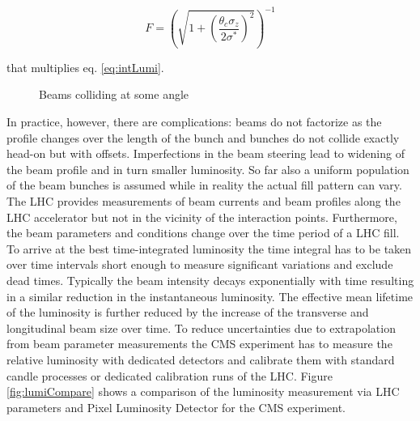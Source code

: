 \begin{equation} \label{eq:lumiAcc}
F = \left(  \sqrt{1 + \left( \frac{\theta_{c} \sigma_{z}}{2 \sigma^{*}} \right ) ^{2}}  \right) ^{-1}
\end{equation}

that multiplies eq. \ref{eq:intLumi}.


\begin{figure}[h]
\centering
{}
\caption{Beams colliding at some angle} \label{fig:rotBeams}
\end{figure}


In practice, however, there are complications: beams do not factorize as the profile changes over the length of the bunch and bunches do not collide exactly head-on but with offsets. Imperfections in the beam steering lead to widening of the beam profile and in turn smaller luminosity. So far also a uniform population of the beam bunches is assumed while in reality the actual fill pattern can vary. The LHC provides measurements of beam currents and beam profiles along the LHC accelerator but not in the vicinity of the interaction points. Furthermore, the beam parameters and conditions change over the time period of a LHC fill. To arrive at the best time-integrated luminosity the time integral has to be taken over time intervals short enough to measure significant variations and exclude dead times. Typically the beam intensity decays exponentially with time resulting in a similar reduction in the instantaneous luminosity. The effective mean lifetime of the luminosity is further reduced by the increase of the transverse and longitudinal beam size over time. To reduce uncertainties due to extrapolation from beam parameter measurements the CMS experiment has to measure the relative luminosity with dedicated detectors and calibrate them with standard candle processes or dedicated calibration runs of the LHC. Figure \ref{fig:lumiCompare} shows a comparison of the luminosity measurement via LHC parameters and Pixel Luminosity Detector for the CMS experiment.



